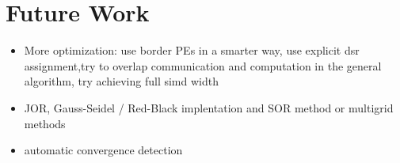 \chapter{Future Work}
\begin{itemize}
    \item More optimization: use border PEs in a smarter way, use explicit dsr assignment,try to overlap communication and computation in the general algorithm, try achieving full simd width
    \item JOR, Gauss-Seidel / Red-Black implentation and SOR method or multigrid methods
    \item automatic convergence detection
\end{itemize} 